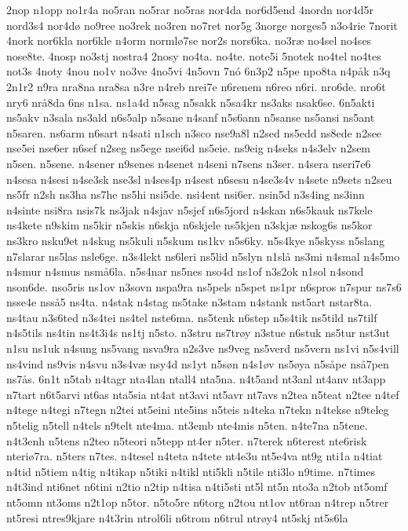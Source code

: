 {2nop
n1opp
no1r4a
no5ran
no5rar
no5ras
nor4da
nor6d5end
4nordn
nor4d5r
nord3s4
nor4dø
no9ree
no3rek
no3ren
no7ret
nor5g
3norge
norges5
n3o4rie
7norit
4nork
nor6kla
nor6kle
n4orm
normlø7se
nor2s
nors6ka.
no3ræ
no4sel
no4ses
nose8te.
4nosp
no3stj
nostra4
2nosy
no4ta.
no4te.
note5i
5notek
no4tel
no4tes
not3s
4noty
4nou
no1v
no3ve
4no5vi
4n5ovn
7nó
6n3p2
n5pe
npo8ta
n4påk
n3q
2n1r2
n9ra
nra8na
nra8sa
n3re
n4reb
nrei7e
n6renem
n6reo
n6ri.
nro6de.
nro6t
nry6
nrå8da
6ns
n1sa.
ns1a4d
n5sag
n5sakk
n5sa4kr
ns3aks
nsak6se.
6n5akti
ns5akv
n3sala
ns3ald
n6s5alp
n5sane
n4sanf
n5s6ann
n5sanse
ns5ansi
ns5ant
n5saren.
ns6arm
n6sart
n4sati
n1sch
n3sco
nse9a8l
n2sed
ns5edd
ns8ede
n2see
nse5ei
nse6er
n6sef
n2seg
ns5ege
nsei6d
ns5eie.
ns9eig
n4seks
n4s3elv
n2sem
n5sen.
n5sene.
n4sener
n9senes
n4senet
n4seni
n7sens
n3ser.
n4sera
nseri7e6
n4sesa
n4sesi
n4se3sk
nse3sl
n4ses4p
n4sest
n6sesu
n4se3s4v
n4sete
n9sets
n2seu
ns5fr
n2sh
ns3ha
ns7he
ns5hi
nsi5de.
nsi4ent
nsi6er.
nsin5d
n3s4ing
ns3inn
n4sinte
nsi8ra
nsis7k
ns3jak
n4sjav
n5sjef
n6s5jord
n4skan
n6s5kauk
ns7kele
ns4kete
n9skim
ns5kir
n5skis
n6skja
n6skjele
ns5kjen
n3skjæ
nskog6s
ns5kor
ns3kro
nsku9et
n4skug
ns5kuli
n5skum
ns1kv
n5s6ky.
n5s4kye
n5skyss
n5slang
n7slarar
ns5las
nsle6ge.
n3s4lekt
ns6leri
ns5lid
n5slyn
n1slå
ns3mi
n4smal
n4s5mo
n4smur
n4smus
nsmå6la.
n5s4nar
ns5nes
nso4d
ns1of
n3s2ok
n1sol
n4sond
nson6de.
nso5ris
ns1ov
n3sovn
nspa9ra
ns5pels
n5spet
ns1pr
n6spros
n7spur
ns7s6
nsse4e
nsså5
ns4ta.
n4stak
n4stag
ns5take
n3stam
n4stank
nst5art
nstar8ta.
ns4tau
n3s6ted
n3s4tei
ns4tel
nste6ma.
ns5tenk
n6step
n5s4tik
ns5tild
ns7tilf
n4s5tils
ns4tin
ns4t3i4s
ns1tj
n5sto.
n3stru
ns7trøy
n3stue
n6stuk
ns5tur
nst3ut
n1su
ns1uk
n4sung
ns5vang
nsva9ra
n2s3ve
ns9veg
ns5verd
ns5vern
ns1vi
n5s4vill
ns4vind
ns9vis
n4svu
n3s4væ
nsy4d
ns1yt
n5søn
n4s1øv
ns5øya
n5såpe
nså7pen
ns7ås.
6n1t
n5tab
n4tagr
nta4lan
ntall4
nta5na.
n4t5and
nt3anl
nt4anv
nt3app
n7tart
n6t5arvi
nt6as
nta5sia
nt4at
nt3avi
nt5avr
nt7avs
n2tea
n5teat
n2tee
n4tef
n4tege
n4tegi
n7tegn
n2tei
nt5eini
nte5ins
n5teis
n4teka
n7tekn
n4tekse
n9teleg
n5telig
n5tell
n4tels
n9telt
nte4ma.
nt3emb
nte4mis
n5ten.
n4te7na
n5tene.
n4t3enh
n5tens
n2teo
n5teori
n5tepp
nt4er
n5ter.
n7terek
n6terest
nte6risk
nteriø7ra.
n5ters
n7tes.
n4tesel
n4teta
n4tete
nt4e3u
nt5e4va
nt9g
nti1a
n4tiat
n4tid
n5tiem
n4tig
n4tikap
n5tiki
n4tikl
nti5kli
n5tile
nti3lo
n9time.
n7times
n4t3ind
nti6net
n6tini
n2tio
n2tip
n4tisa
n4ti5sti
nt5l
nt5n
nto3a
n2tob
nt5omf
nt5omn
nt3oms
n2t1op
n5tor.
n5to5re
n6torg
n2tou
nt1ov
nt6ran
n4trep
n5trer
nt5resi
ntres9kjare
n4t3rin
ntrol6li
n6trom
n6trul
ntrøy4
nt5skj
nt5s6la
}
